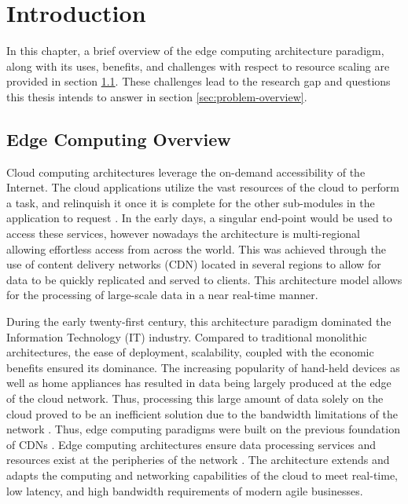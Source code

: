 \clearpage

\def\chaptertitle{Introduction}

\lhead{\emph{\chaptertitle}}

\chapter{\chaptertitle}
\label{ch:introduction}

In this chapter, a brief overview of the edge computing architecture paradigm, along with its uses, benefits, and challenges with respect to resource scaling are provided in section \ref{sec:edge-arch}. These challenges lead to the research gap and questions this thesis intends to answer in section \ref{sec:problem-overview}.\par

\section{Edge Computing Overview}
\label{sec:edge-arch}

Cloud computing architectures leverage the on-demand accessibility of the Internet. The cloud applications utilize the vast resources of the cloud to perform a task, and relinquish it once it is complete for the other sub-modules in the application to request \cite{rimal2009taxonomy}. In the early days, a singular end-point would be used to access these services, however nowadays the architecture is multi-regional allowing effortless access from across the world. This was achieved through the use of content delivery networks (CDN) located in several regions to allow for data to be quickly replicated and served to clients. This architecture model allows for the processing of large-scale data in a near real-time manner.\par

During the early twenty-first century, this architecture paradigm dominated the Information Technology (IT) industry. Compared to traditional monolithic architectures, the ease of deployment, scalability, coupled with the economic benefits ensured its dominance. The increasing popularity of hand-held devices as well as home appliances has resulted in data being largely produced at the edge of the cloud network. Thus, processing this large amount of data solely on the cloud proved to be an inefficient solution due to the bandwidth limitations of the network \cite{shi2016edge}. Thus, edge computing paradigms were built on the previous foundation of CDNs \cite{satyanarayanan2017emergence}. Edge computing architectures ensure data processing services and resources exist at the peripheries of the network \cite{cao2020overview}. The architecture extends and adapts the computing and networking capabilities of the cloud to meet real-time, low latency, and high bandwidth requirements of modern agile businesses.\par

